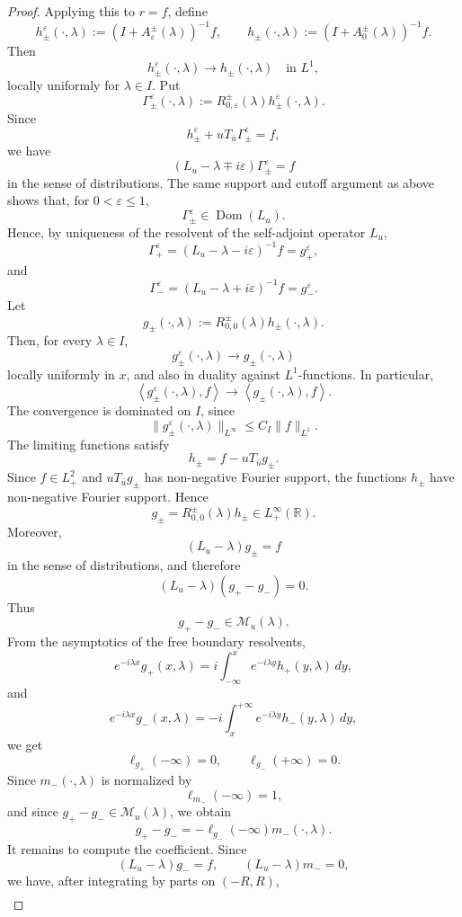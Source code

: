 \documentclass[10pt]{article}
\numberwithin{equation}{section}
\numberwithin{theorem}{section}
\begin{document}
\begin{proof}
Applying this to \(r=f\), define
\[
h_\pm^\varepsilon(\cdot,\lambda)
:=
(I+A_\varepsilon^\pm(\lambda))^{-1}f,
\qquad
h_\pm(\cdot,\lambda)
:=
(I+A_0^\pm(\lambda))^{-1}f.
\]
Then
\[
h_\pm^\varepsilon(\cdot,\lambda)
\to
h_\pm(\cdot,\lambda)
\quad\text{in }L^1,
\]
locally uniformly for \(\lambda\in I\). Put
\[
\Gamma_\pm^\varepsilon(\cdot,\lambda)
:=
R_{0,\varepsilon}^{\pm}(\lambda)h_\pm^\varepsilon(\cdot,\lambda).
\]
Since
\[
h_\pm^\varepsilon
+
uT_{\bar u}\Gamma_\pm^\varepsilon
=
f,
\]
we have
\[
(L_u-\lambda\mp i\varepsilon)\Gamma_\pm^\varepsilon=f
\]
in the sense of distributions. The same support and cutoff argument as above
shows that, for \(0<\varepsilon\leq1\),
\[
\Gamma_\pm^\varepsilon\in\operatorname{Dom}(L_u).
\]
Hence, by uniqueness of the resolvent of the self-adjoint operator \(L_u\),
\[
\Gamma_+^\varepsilon
=
(L_u-\lambda-i\varepsilon)^{-1}f
=
g_+^\varepsilon,
\]
and
\[
\Gamma_-^\varepsilon
=
(L_u-\lambda+i\varepsilon)^{-1}f
=
g_-^\varepsilon .
\]
Let
\[
g_\pm(\cdot,\lambda)
:=
R_{0,0}^{\pm}(\lambda)h_\pm(\cdot,\lambda).
\]
Then, for every \(\lambda\in I\),
\[
g_\pm^\varepsilon(\cdot,\lambda)
\longrightarrow
g_\pm(\cdot,\lambda)
\]
locally uniformly in \(x\), and also in duality against \(L^1\)-functions. In
particular,
\[
\left\langle g_\pm^\varepsilon(\cdot,\lambda),f\right\rangle
\longrightarrow
\left\langle g_\pm(\cdot,\lambda),f\right\rangle .
\]
The convergence is dominated on \(I\), since
\[
\|g_\pm^\varepsilon(\cdot,\lambda)\|_{L^\infty}
\leq
C_I\|f\|_{L^1}.
\]
The limiting functions satisfy
\[
h_\pm=f-uT_{\bar u}g_\pm.
\]
Since \(f\in L^2_+\) and \(uT_{\bar u}g_\pm\) has non-negative Fourier support,
the functions \(h_\pm\) have non-negative Fourier support. Hence
\[
g_\pm=R_{0,0}^{\pm}(\lambda)h_\pm
\in L^\infty_+(\mathbb R).
\]
Moreover,
\[
(L_u-\lambda)g_\pm=f
\]
in the sense of distributions, and therefore
\[
(L_u-\lambda)(g_+-g_-)=0.
\]
Thus
\[
g_+-g_-\in\mathscr M_u(\lambda).
\]
From the asymptotics of the free boundary resolvents,
\[
e^{-i\lambda x}g_+(x,\lambda)
=
i\int_{-\infty}^x e^{-i\lambda y}h_+(y,\lambda)\,dy,
\]
and
\[
e^{-i\lambda x}g_-(x,\lambda)
=
-i\int_x^{+\infty}e^{-i\lambda y}h_-(y,\lambda)\,dy,
\]
we get
\[
\ell_{g_+}(-\infty)=0,
\qquad
\ell_{g_-}(+\infty)=0.
\]
Since \(m_-(\cdot,\lambda)\) is normalized by
\[
\ell_{m_-}(-\infty)=1,
\]
and since \(g_+-g_-\in\mathscr M_u(\lambda)\), we obtain
\[
g_+-g_-=-\ell_{g_-}(-\infty)m_-(\cdot,\lambda).
\]
It remains to compute the coefficient. Since
\[
(L_u-\lambda)g_-=f,
\qquad
(L_u-\lambda)m_-=0,
\]
we have, after integrating by parts on \((-R,R)\),
\[
\begin{aligned}

\end{aligned}\]
\end{proof}
\end{document}
